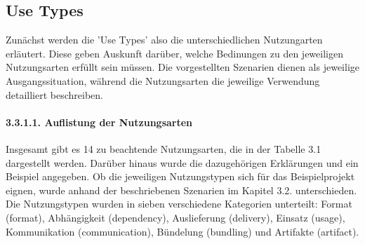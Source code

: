 \subsection{Use Types}

Zunächst werden die 'Use Types' also die unterschiedlichen Nutzungarten erläutert. Diese geben Auskunft darüber, welche Bedinungen zu den jeweiligen Nutzungsarten erfüllt sein müssen. Die vorgestellten Szenarien dienen als jeweilige Ausgangssituation, während die Nutzungsarten die jeweilige Verwendung detailliert beschreiben. 

\paragraph{3.3.1.1. Auflistung der Nutzungsarten}

Insgesamt gibt es 14 zu beachtende Nutzungsarten, die in der Tabelle 3.1 dargestellt werden. Darüber hinaus wurde die dazugehörigen Erklärungen und ein Beispiel angegeben. Ob die jeweiligen  Nutzungstypen sich für das Beispielprojekt eignen, wurde anhand der beschriebenen Szenarien im Kapitel 3.2. unterschieden. Die Nutzungstypen wurden in sieben verschiedene Kategorien unterteilt: Format (format), Abhängigkeit (dependency), Auslieferung (delivery), Einsatz (usage), Kommunikation (communication), Bündelung (bundling) und Artifakte (artifact).

\newcommand\A{\rule{0pt}{7ex}}
\newcommand\C{\rule[-6ex]{0pt}{0pt}}
\newcommand\D{\rule{0pt}{5ex}}
\newcommand\E{\rule[-4ex]{0pt}{0pt}}
\newcommand\F{\rule{0pt}{9ex}}
\newcommand\G{\rule[-8ex]{0pt}{0pt}}

